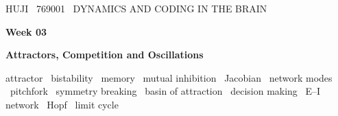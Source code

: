 
\renewcommand{\headleft}{769001 \textperiodcentered\ WEEK 03}
\renewcommand{\headright}{DYNAMICS AND CODING IN THE BRAIN}

\newcommand{\figcap}[1]{\par\smallskip{\small\color{muted}#1}\par}
\newcommand{\hext}{h^{\text{ext}}}
\newcommand{\dr}{\delta r}
\newcommand{\E}{\mathrm{E}}
\newcommand{\I}{\mathrm{I}}
\newcommand{\Tr}{\operatorname{tr}}
\newcommand{\parttitle}[2]{%
  \clearpage
  {\ttfamily\small\color{pgreen}#1}\par\vspace{2pt}
  {\sffamily\bfseries\fontsize{26}{30}\selectfont\color{pgold}#2}\par
  \vspace{4pt}{\color{border}\rule{\linewidth}{1.8pt}}\par\vspace{0.6em}%
  \addtocontents{toc}{\protect\tocpart{#1}}}
\newcommand{\tocpart}[1]{\par\smallskip{\ttfamily\scriptsize\color{pgreen}#1}\par}

\graphicspath{{figures/week03/}}



{\ttfamily\small\color{pgreen}HUJI \textperiodcentered\ 769001 \textperiodcentered\ DYNAMICS AND CODING IN THE BRAIN}\par\vspace{6pt}
{\sffamily\bfseries\fontsize{30}{34}\selectfont\color{pgold}Week 03}\par\vspace{4pt}
{\sffamily\bfseries\Large\color{pgold}Attractors, Competition and Oscillations}\par\vspace{4pt}
{\ttfamily\small\color{pcyan}attractor \textperiodcentered\ bistability \textperiodcentered\ memory \textperiodcentered\ mutual inhibition \textperiodcentered\ Jacobian \textperiodcentered\ network modes \textperiodcentered\ pitchfork \textperiodcentered\ symmetry breaking \textperiodcentered\ basin of attraction \textperiodcentered\ decision making \textperiodcentered\ E--I network \textperiodcentered\ Hopf \textperiodcentered\ limit cycle}\par
\vspace{0.8em}

